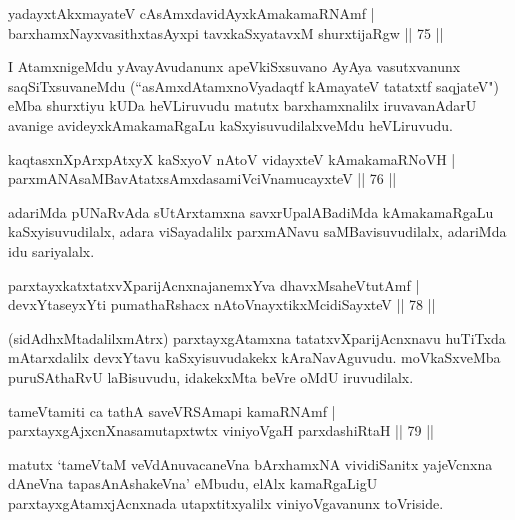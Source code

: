 \begin{shl}
yadayxtAkxmayateV cAsAmxdavidAyxkAmakamaRNAmf |\\
barxhamxNayxvasithxtasAyxpi tavxkaSxyatavxM shurxtijaRgw \hfill || 75 ||
\end{shl}

\begin{artha}
I AtamxnigeMdu yAvayAvudanunx apeVkiSxsuvano AyAya vasutxvanunx saqSiTxsuvaneMdu (``asAmxdAtamxnoVyadaqtf kAmayateV tatatxtf saqjateV") eMba shurxtiyu kUDa heVLiruvudu matutx barxhamxnalilx iruvavanAdarU avanige avideyxkAmakamaRgaLu kaSxyisuvudilalxveMdu heVLiruvudu.
\end{artha}


\begin{shl}
kaqtasxnXpArxpAtxyX kaSxyoV nAtoV vidayxteV kAmakamaRNoVH |\\
parxmANAsaMBavAtatxsAmxdasamiVciVnamucayxteV \hfill || 76 ||
\end{shl}

\begin{artha}
adariMda pUNaRvAda sUtArxtamxna savxrUpalABadiMda kAmakamaRgaLu kaSxyisuvudilalx, adara viSayadalilx parxmANavu saMBavisuvudilalx, adariMda idu sariyalalx.
\end{artha}


\begin{shl}
parxtayxkatxtatxvXparijAcnxnajanemxYva dhavxMsaheVtutAmf |\\
devxYtaseyxYti pumathaRshacx nAtoV\s nayxtikxMcidiSayxteV \hfill || 78 ||
\end{shl}

\begin{artha}
(sidAdhxMtadalilxmAtrx) parxtayxgAtamxna tatatxvXparijAcnxnavu huTiTxda mAtarxdalilx devxYtavu kaSxyisuvudakekx kAraNavAguvudu. moVkaSxveMba puruSAthaRvU laBisuvudu, idakekxMta beVre oMdU iruvudilalx.
\end{artha}

\begin{shl}
tameVtamiti ca tathA saveVRSAmapi kamaRNAmf |\\
parxtayxgAjxcnXnasamutapxtwtx viniyoVgaH parxdashiRtaH \hfill || 79 ||
\end{shl}

\begin{artha}
matutx `tameVtaM veVdAnuvacaneVna bArxhamxNA vividiSanitx yajeVcnxna dAneVna tapasA\s nAshakeVna' eMbudu, elAlx kamaRgaLigU parxtayxgAtamxjAcnxnada utapxtitxyalilx viniyoVgavanunx toVriside.
\end{artha}

